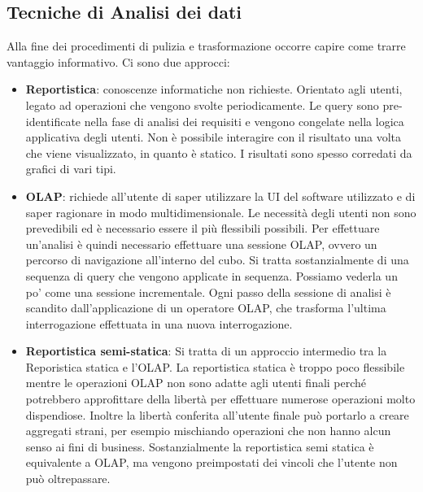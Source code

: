 \subsection{Tecniche di Analisi dei dati}
Alla fine dei procedimenti di pulizia e trasformazione occorre capire come trarre vantaggio informativo.
Ci sono due approcci:
\begin{itemize}
	\item \textbf{Reportistica}: conoscenze informatiche non richieste. Orientato agli utenti, legato ad operazioni che vengono svolte periodicamente. Le query sono pre-identificate nella fase di analisi dei requisiti e vengono congelate nella logica applicativa degli utenti. Non è possibile interagire con il risultato una volta che viene visualizzato, in quanto è statico. I risultati sono spesso corredati da grafici di vari tipi.
	\item \textbf{OLAP}: richiede all'utente di saper utilizzare la UI del software utilizzato e di saper ragionare in modo multidimensionale. Le necessità degli utenti non sono prevedibili ed è necessario essere il più flessibili possibili. Per effettuare un'analisi è quindi necessario effettuare una sessione OLAP, ovvero un percorso di navigazione all'interno del cubo. Si tratta sostanzialmente di una sequenza di query che vengono applicate in sequenza. Possiamo vederla un po' come una sessione incrementale. Ogni passo della sessione di analisi è scandito dall'applicazione di un operatore OLAP, che trasforma l'ultima interrogazione effettuata in una nuova interrogazione.
	\item \textbf{Reportistica semi-statica}: Si tratta di un approccio intermedio tra la Reporistica statica e l'OLAP. La reportistica statica è troppo poco flessibile mentre le operazioni OLAP non sono adatte agli utenti finali perché potrebbero approfittare della libertà per effettuare numerose operazioni molto dispendiose. Inoltre la libertà conferita all'utente finale può portarlo a creare aggregati strani, per esempio mischiando operazioni che non hanno alcun senso ai fini di business. Sostanzialmente la reportistica semi statica è equivalente a OLAP, ma vengono preimpostati dei vincoli che l'utente non può oltrepassare.
\end{itemize}
